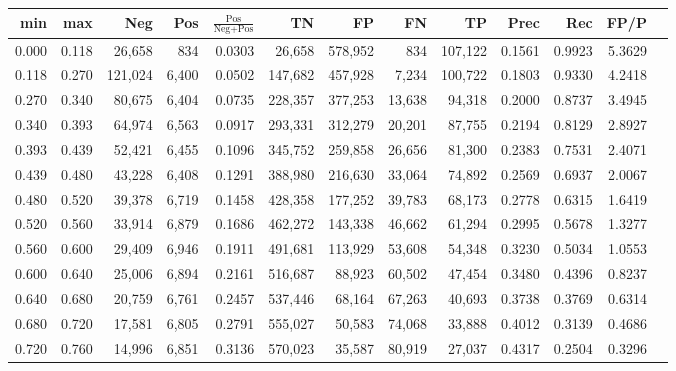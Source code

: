 \begin{tabular}{rrrrrrrrrrrrr}
\toprule
  min &   max &     Neg &   Pos & $\frac{\text{Pos}}{\text{Neg}+\text{Pos}}$ &      TN &      FP &      FN &      TP &   Prec &    Rec &   FP/P \\
\midrule
0.000 & 0.118 &  26,658 &   834 &                                     0.0303 &  26,658 & 578,952 &     834 & 107,122 & 0.1561 & 0.9923 & 5.3629 \\
0.118 & 0.270 & 121,024 & 6,400 &                                     0.0502 & 147,682 & 457,928 &   7,234 & 100,722 & 0.1803 & 0.9330 & 4.2418 \\
0.270 & 0.340 &  80,675 & 6,404 &                                     0.0735 & 228,357 & 377,253 &  13,638 &  94,318 & 0.2000 & 0.8737 & 3.4945 \\
0.340 & 0.393 &  64,974 & 6,563 &                                     0.0917 & 293,331 & 312,279 &  20,201 &  87,755 & 0.2194 & 0.8129 & 2.8927 \\
0.393 & 0.439 &  52,421 & 6,455 &                                     0.1096 & 345,752 & 259,858 &  26,656 &  81,300 & 0.2383 & 0.7531 & 2.4071 \\
0.439 & 0.480 &  43,228 & 6,408 &                                     0.1291 & 388,980 & 216,630 &  33,064 &  74,892 & 0.2569 & 0.6937 & 2.0067 \\
0.480 & 0.520 &  39,378 & 6,719 &                                     0.1458 & 428,358 & 177,252 &  39,783 &  68,173 & 0.2778 & 0.6315 & 1.6419 \\
0.520 & 0.560 &  33,914 & 6,879 &                                     0.1686 & 462,272 & 143,338 &  46,662 &  61,294 & 0.2995 & 0.5678 & 1.3277 \\
0.560 & 0.600 &  29,409 & 6,946 &                                     0.1911 & 491,681 & 113,929 &  53,608 &  54,348 & 0.3230 & 0.5034 & 1.0553 \\
0.600 & 0.640 &  25,006 & 6,894 &                                     0.2161 & 516,687 &  88,923 &  60,502 &  47,454 & 0.3480 & 0.4396 & 0.8237 \\
0.640 & 0.680 &  20,759 & 6,761 &                                     0.2457 & 537,446 &  68,164 &  67,263 &  40,693 & 0.3738 & 0.3769 & 0.6314 \\
0.680 & 0.720 &  17,581 & 6,805 &                                     0.2791 & 555,027 &  50,583 &  74,068 &  33,888 & 0.4012 & 0.3139 & 0.4686 \\
0.720 & 0.760 &  14,996 & 6,851 &                                     0.3136 & 570,023 &  35,587 &  80,919 &  27,037 & 0.4317 & 0.2504 & 0.3296 \\

\end{tabular}
